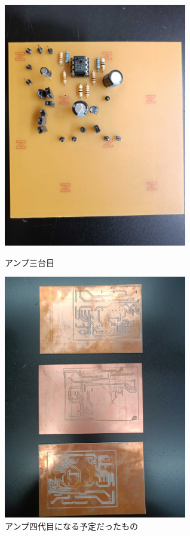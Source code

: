 \documentclass[report.tex]{subfiles}
\begin{document}
\begin{figure}[H]
	\begin{minipage}[b]{0.5\linewidth}
		\centering
		\includegraphics[width=8cm]{use/5.jpg}
		\caption{アンプ三台目}
		\label{fig:s_4}
	\end{minipage}
	\begin{minipage}[b]{0.5\linewidth}
		\centering
		\includegraphics[width=8cm]{use/6.jpg}
		\caption{アンプ四代目になる予定だったもの}
		\label{fig:s_5}
	\end{minipage}
\end{figure}
\end{document}
